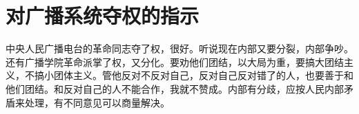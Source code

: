 \section[对广播系统夺权的指示（一九六七年一月二十三日）]{对广播系统夺权的指示}


中央人民广播电台的革命同志夺了权，很好。听说现在内部又要分裂，内部争吵。还有广播学院革命派掌了权，又分化。要劝他们团结，以大局为重，要搞大团结主义，不搞小团体主义。管他反对不反对自己，反对自己反对错了的人，也要善于和他们团结。和反对自己的人不能合作，我就不赞成。内部有分歧，应按人民内部矛盾来处理，有不同意见可以商量解决。

